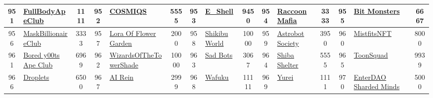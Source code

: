 \begin{table*}[]
{\begin{tabular}{|c|l|c|c|l|c|c|l|c|c|l|c|c|l|c|}
        951   & \href{https://fullbodyapeclub.com/}{FullBodyApeClub}                               & 1111              & 952   & \href{https://twitter.com/mazukolabs}{COSMIQS}                                                    & 5555              & 953   & \href{https://www.elysiumshell.xyz/}{E\_Shell}                                    & 9450              & 954   & \href{https://raccoonmafia.com/}{Raccoon Mafia}                               & 3333              & 955   & \href{https://bitmonsters.io/}{Bit Monsters}                                              & 6667                                    \\ \hline
        956   & \href{https://maskbillionaireclub.com}{MaskBillionaireClub}                        & 3333              & 957   & \href{https://paragraph.xyz/@LoraOfFlowerGarden/}{Lora Of Flower Garden}                          & 2000              & 958   & \href{https://shikibuworld.com/}{Shikibu World}                                   & 10000             & 959   & \href{https://astrobot.tokenmetrics.com}{Astrobot Society}                    & 3950              & 960   & \href{https://www.mistfitsnft.com/}{MistfitsNFT}                                          & 8000                                    \\ \hline
        961   & \href{https://boredy00tsac.xyz/}{Bored y00ts Ape Club}                             & 6969              & 962   & \href{https://wizardsofthetower.xyz/}{WizardsOfTheTowerShade}                                     & 10000             & 963   & \href{http://sadbots.io}{Sad Bots}                                                & 3067              & 964   & \href{https://www.theshibashelter.com/}{Shiba Shelter}                        & 5555              & 965   & \href{https://toonsquadnft.io}{ToonSquad}                                                 & 9939                                    \\ \hline
        966   & \href{https://droplets.lol/}{Droplets}                                             & 6500              & 967   & \href{https://ai-rein.net}{AI Rein}                                                               & 2999              & 968   & \href{https://wafukunft.io/}{Wafuku}                                              & 11111             & 969   & \href{https://www.yureispirit.xyz/}{Yurei}                                    & 1111              & 970   & \href{https://sharded-minds.enterdao.xyz/}{EnterDAO Sharded Minds}                        & 5000                                    \\ \hline

\end{tabular}}
\end{table*}
